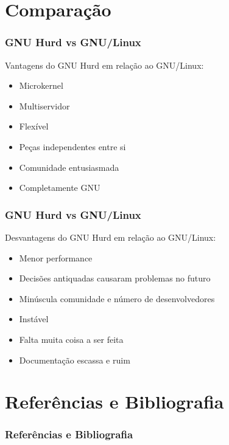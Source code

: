 \documentclass[10pt]{beamer}
\theoremstyle{plain}
\begin{document}
\section{Comparação}

\begin{frame}
  \frametitle{GNU Hurd vs GNU/Linux}
  Vantagens do GNU Hurd em relação ao GNU/Linux:
  \begin{itemize}
    \item Microkernel
    \item Multiservidor
    \item Flexível
    \item Peças independentes entre si
    \item Comunidade entusiasmada
    \item Completamente GNU
  \end{itemize}
\end{frame}

\begin{frame}
  \frametitle{GNU Hurd vs GNU/Linux}
  Desvantagens do GNU Hurd em relação ao GNU/Linux:
  \begin{itemize}
    \item Menor performance
    \item Decisões antiquadas causaram problemas no futuro
    \item Minúscula comunidade e número de desenvolvedores
    \item Instável
    \item Falta muita coisa a ser feita
    \item Documentação escassa e ruim
  \end{itemize}
\end{frame}


\section[Referências]{Referências e Bibliografia}
\begin{frame}[t,allowframebreaks]
  \frametitle{Referências e Bibliografia}
  \footnotesize
  \nocite{*}
  \printbibliography[]
\end{frame}
\end{document}
